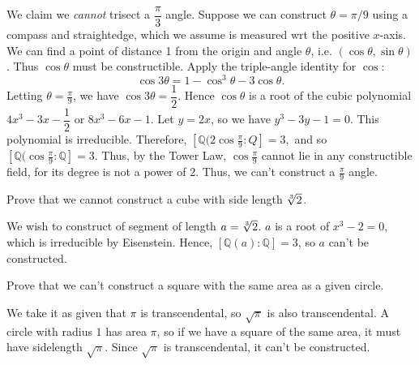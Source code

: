 \documentclass{scrartcl}
\begin{document}
\begin{solution}
	We claim we \textit{cannot} trisect a $\dfrac{\pi}{3}$ angle. Suppose we can construct $\theta = \pi/9$ using a compass and straightedge, which we assume is measured wrt the positive $x$-axis. We can find a point of distance 1 from the origin and angle $\theta$, i.e. $(\cos \theta, \sin \theta)$. Thus $\cos \theta$ must be constructible. Apply the triple-angle identity for $\cos$:
	$$\cos 3\theta = 1 - \cos ^3 \theta - 3 \cos \theta.$$
	Letting $\theta = \frac{\pi}{9}$, we have $\cos 3\theta = \dfrac{1}{2}$. Hence $\cos \theta$ is a root of the cubic polynomial $4x^3 - 3x - \dfrac{1}{2}$ or $8x^3 - 6x - 1$. Let $y = 2x$, so we have $y^3 - 3y - 1 = 0$. This polynomial is irreducible. Therefore, $[\mathbb{Q}(2 \cos \frac{\pi}{9} : Q] = 3,$ and so $[\mathbb{Q}(\cos \frac{\pi}{9} : \mathbb{Q}] = 3$. Thus, by the Tower Law, $\cos \frac{\pi}{9}$ cannot lie in any constructible field, for its degree is not a power of 2. Thus, we can't construct a $\frac{\pi}{9}$ angle.
\end{solution}

\begin{problem}
	Prove that we cannot construct a cube with side length $\sqrt[3]{2}$.
\end{problem}

\begin{solution}
	We wish to construct of segment of length $a = \sqrt[3]{2}$. $a$ is a root of $x^3-2=0$, which is irreducible by Eisenstein. Hence, $[\mathbb{Q}(a) : \mathbb{Q}] = 3$, so $a$ can't be constructed.
\end{solution}

\begin{problem}
	Prove that we can't construct a square with the same area as a given circle.
\end{problem}

\begin{solution}
	We take it as given that $\pi$ is transcendental, so $\sqrt \pi$ is also transcendental. A circle with radius $1$ has area $\pi$, so if we have a square of the same area, it must have sidelength $\sqrt{\pi}$. Since $\sqrt{\pi}$ is transcendental, it can't be constructed.
\end{solution}
\end{document}
